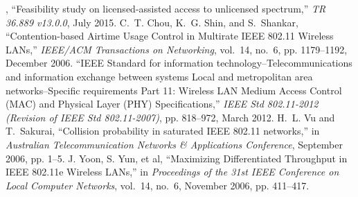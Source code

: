 %

\begin{thebibliography}{99.}%
	, ``Feasibility study on licensed-assisted access to unlicensed spectrum,'' \emph{{TR 36.889 v13.0.0}}, July 2015.
	 C.~T. Chou, K.~G. Shin, and S.~Shankar, ``{Contention-based Airtime Usage Control in Multirate IEEE 802.11 Wireless LANs},'' \emph{{IEEE/ACM Transactions on Networking}}, vol.~14, no.~6, pp. 1179--1192, December 2006.	
	``{IEEE Standard for information technology--Telecommunications and information exchange between systems Local and metropolitan area networks--Specific requirements Part 11: Wireless LAN Medium Access Control (MAC) and Physical Layer (PHY) Specifications},'' \emph{{IEEE Std 802.11-2012 (Revision of IEEE Std 802.11-2007)}}, pp. 818--972, March 2012.	
	 H.~L. Vu and T.~Sakurai, ``{Collision probability in saturated IEEE 802.11 networks},'' in \emph{{Australian Telecommunication Networks \& Applications Conference}}, September 2006, pp. 1--5.
	 {J. Yoon, S. Yun, et al}, ``{Maximizing Differentiated Throughput in IEEE 802.11e Wireless LANs},'' in \emph{{ Proceedings of the 31st IEEE Conference on Local Computer Networks}}, vol.~14, no.~6, November 2006, pp. 411--417.
\end{thebibliography}


